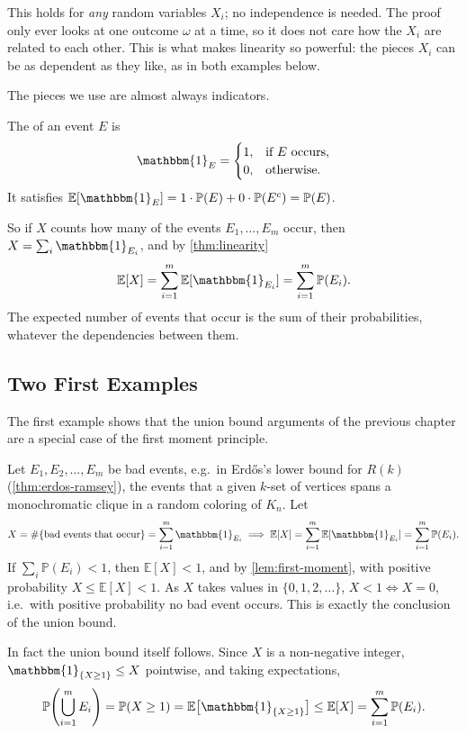 \begin{remark}
    This holds for \emph{any} random variables \(X_i\); no independence is needed. The proof only ever looks at one outcome \(\omega\) at a time, so it does not care how the \(X_i\) are related to each other. This is what makes linearity so powerful: the pieces \(X_i\) can be as dependent as they like, as in both examples below.
\end{remark}

The pieces we use are almost always indicators.

\begin{definition}[Indicator]
    The  of an event \(E\) is
    \[
        \mathbbm{1}_E =
        \begin{cases}
            1, & \text{if } E \text{ occurs}, \\
            0, & \text{otherwise}.
        \end{cases}
    \]
    It satisfies \(\mathbb{E}[\mathbbm{1}_E] = 1 \cdot \mathbb{P}(E) + 0 \cdot \mathbb{P}(E^c) = \mathbb{P}(E)\).
\end{definition}

So if \(X\) counts how many of the events \(E_1, \ldots, E_m\) occur, then \(X = \sum_{i} \mathbbm{1}_{E_i}\), and by \autoref{thm:linearity}
\[
    \mathbb{E}[X] = \sum_{i=1}^{m} \mathbb{E}[\mathbbm{1}_{E_i}] = \sum_{i=1}^{m} \mathbb{P}(E_i).
\]
The expected number of events that occur is the sum of their probabilities, whatever the dependencies between them.

\subsection{Two First Examples}

The first example shows that the union bound arguments of the previous chapter are a special case of the first moment principle.

\begin{eg}\label{eg:union-bound-expectation}
    Let \(E_1, E_2, \ldots, E_m\) be bad events, e.g.\ in Erd\H{o}s's lower bound for \(R(k)\) (\autoref{thm:erdos-ramsey}), the events that a given \(k\)-set of vertices spans a monochromatic clique in a random coloring of \(K_n\). Let
    \[
        X = \#\{\text{bad events that occur}\} = \sum_{i=1}^{m} \mathbbm{1}_{E_i}
        \implies \mathbb{E}[X] = \sum_{i=1}^{m} \mathbb{E}[\mathbbm{1}_{E_i}] = \sum_{i=1}^{m} \mathbb{P}(E_i).
    \]
    If \(\sum_{i} \mathbb{P}(E_i) < 1\), then \(\mathbb{E}[X] < 1\), and by \autoref{lem:first-moment}, with positive probability \(X \le \mathbb{E}[X] < 1\). As \(X\) takes values in \(\{0, 1, 2, \ldots\}\), \(X < 1 \iff X = 0\), i.e.\ with positive probability no bad event occurs. This is exactly the conclusion of the union bound.

    In fact the union bound itself follows. Since \(X\) is a non-negative integer, \(\mathbbm{1}_{\{X \ge 1\}} \le X\) pointwise, and taking expectations,
    \[
        \mathbb{P}\Biggl( \bigcup_{i=1}^{m} E_i \Biggr) = \mathbb{P}(X \ge 1) = \mathbb{E}\bigl[ \mathbbm{1}_{\{X \ge 1\}} \bigr] \le \mathbb{E}[X] = \sum_{i=1}^{m} \mathbb{P}(E_i).
    \]
\end{eg}


